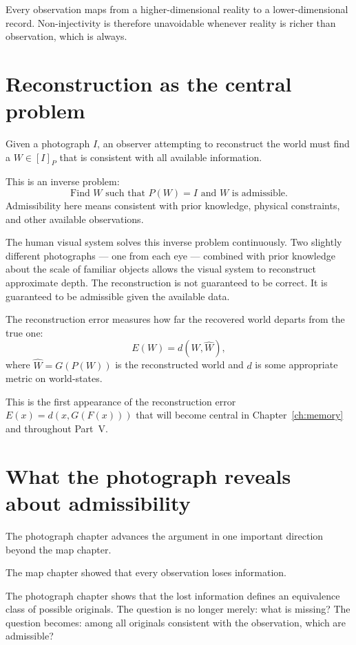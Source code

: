 Every observation maps from a higher-dimensional reality to a
lower-dimensional record.
Non-injectivity is therefore unavoidable whenever reality is
richer than observation, which is always.

\section{Reconstruction as the central problem}

Given a photograph $I$, an observer attempting to reconstruct the
world must find a $W \in [I]_P$ that is consistent with all
available information.

This is an inverse problem:
\[
  \text{Find } W \text{ such that } P(W) = I
  \text{ and } W \text{ is admissible.}
\]
Admissibility here means consistent with prior knowledge, physical
constraints, and other available observations.

\begin{example}
  The human visual system solves this inverse problem
  continuously.
  Two slightly different photographs --- one from each eye ---
  combined with prior knowledge about the scale of familiar objects
  allows the visual system to reconstruct approximate depth.
  The reconstruction is not guaranteed to be correct.
  It is guaranteed to be admissible given the available data.
\end{example}

The reconstruction error measures how far the recovered world
departs from the true one:
\[
  E(W) = d(W, \hat{W}),
\]
where $\hat{W} = G(P(W))$ is the reconstructed world and
$d$ is some appropriate metric on world-states.

This is the first appearance of the reconstruction error
$E(x) = d(x, G(F(x)))$ that will become central in
Chapter~\ref{ch:memory} and throughout Part~V\@.

\section{What the photograph reveals about admissibility}

The photograph chapter advances the argument in one important
direction beyond the map chapter.

The map chapter showed that every observation loses information.

The photograph chapter shows that the lost information defines
an equivalence class of possible originals.
The question is no longer merely: what is missing?
The question becomes: among all originals consistent with the
observation, which are admissible?

